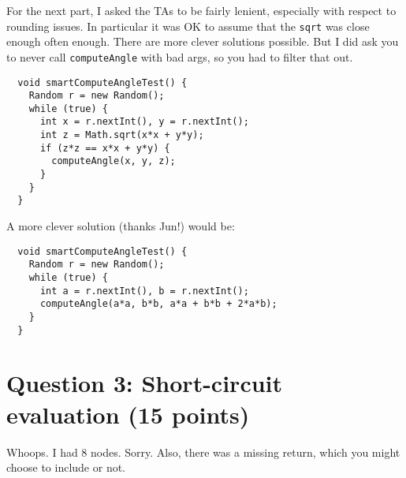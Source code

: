 \documentclass[12pt]{article}
\begin{document}
For the next part, I asked the TAs to be fairly lenient, especially with
respect to rounding issues. In particular it was OK to assume that the 
{\tt sqrt} was close enough often enough. There are more clever solutions possible.
But I did ask you to never call {\tt computeAngle} with bad args, so you had
to filter that out.
\begin{lstlisting}
  void smartComputeAngleTest() {
    Random r = new Random();
    while (true) {
      int x = r.nextInt(), y = r.nextInt();
      int z = Math.sqrt(x*x + y*y);
      if (z*z == x*x + y*y) {
        computeAngle(x, y, z);
      }
    }
  }
\end{lstlisting}
A more clever solution (thanks Jun!) would be:
\begin{lstlisting}
  void smartComputeAngleTest() {
    Random r = new Random();
    while (true) {
      int a = r.nextInt(), b = r.nextInt();
      computeAngle(a*a, b*b, a*a + b*b + 2*a*b);
    }
  }
\end{lstlisting}

\newpage
\section*{Question 3: Short-circuit evaluation (15 points)}
Whoops. I had 8 nodes. Sorry. Also, there was a missing return, which you might choose to include or not.
\begin{center}
\end{center}
\end{document}
